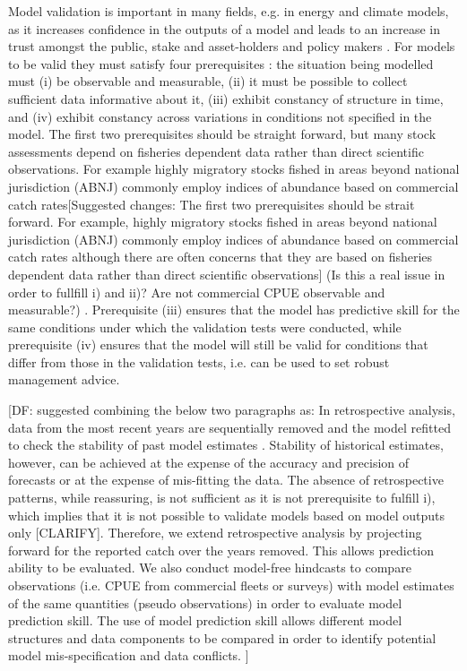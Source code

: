Model validation is important in many fields, e.g. in energy and climate models, as it increases confidence in the outputs of a model and leads to an increase in trust amongst the public, stake and asset-holders and policy makers \parencite{kell2019optimising}. For models to be valid they must satisfy four prerequisites \parencite{hodges1992you}: the situation being modelled must (i) be observable and measurable, (ii) it must be possible to collect sufficient data informative about it, (iii) exhibit constancy of structure in time, and (iv) exhibit constancy across variations in conditions not specified in the model. The first two prerequisites should be straight forward, but many stock assessments depend on fisheries dependent data rather than direct scientific observations. For example highly migratory stocks fished in areas beyond national jurisdiction (ABNJ) commonly employ indices of abundance based on commercial catch rates[Suggested changes: The first two prerequisites should be strait forward. For example, highly migratory stocks fished in areas beyond national jurisdiction (ABNJ) commonly employ indices of abundance based on commercial catch rates although there are often concerns that they are based on fisheries dependent data rather than direct scientific observations] (Is this a real issue in order to fullfill i) and ii)? Are not commercial CPUE observable and measurable?) . Prerequisite (iii) ensures that the model has predictive skill for the same conditions under which the validation tests were conducted, while prerequisite (iv) ensures that the model will still be valid for conditions that differ from those in the validation tests, i.e. can be used to set robust management advice.

[DF: suggested combining the below two paragraphs as:
In retrospective analysis, data from the most recent years are sequentially removed and the model refitted to check the stability of past model estimates \parencite{hurtado2014looking}. Stability of historical estimates, however, can be achieved at the expense of the accuracy and precision of forecasts or at the expense of mis-fitting the data. The absence of retrospective patterns, while reassuring, is not sufficient as it is not prerequisite to fulfill i), which implies that it is not possible to validate models based on model outputs only [CLARIFY]. Therefore, we extend retrospective analysis by projecting forward for the reported catch over the years removed. This allows prediction ability to be evaluated. We also conduct model-free hindcasts to compare observations (i.e. CPUE from commercial fleets or surveys) with model estimates of the same quantities (pseudo observations) in order to evaluate model prediction skill. The use of model prediction skill allows different model structures and data components to be compared in order to identify potential model mis-specification and data conflicts. 
]


